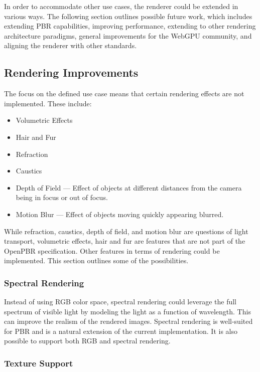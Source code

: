In order to accommodate other use cases, the renderer could be extended in various ways. The following section outlines possible future work, which includes extending \gls{PBR} capabilities, improving performance, extending to other rendering architecture paradigms, general improvements for the \gls{WebGPU} community, and aligning the renderer with other standards.

\subsection*{Rendering Improvements}

The focus on the defined use case means that certain rendering effects are not implemented. These include:

\begin{itemize}
  \item{Volumetric Effects}
  \item{Hair and Fur}
  \item{Refraction}
  \item{Caustics}
  \item{Depth of Field} — Effect of objects at different distances from the camera being in focus or out of focus.
  \item{Motion Blur} — Effect of objects moving quickly appearing blurred.
\end{itemize}

While refraction, caustics, depth of field, and motion blur are questions of light transport, volumetric effects, hair and fur are features that are not part of the \gls{OpenPBR} specification. Other features in terms of rendering could be implemented. This section outlines some of the possibilities.

\subsubsection*{Spectral Rendering}

Instead of using \gls{RGB} color space, spectral rendering could leverage the full spectrum of visible light by modeling the light as a function of wavelength. This can improve the realism of the rendered images. Spectral rendering is well-suited for \gls{PBR} and is a natural extension of the current implementation. It is also possible to support both \gls{RGB} and spectral rendering.

\subsubsection*{Texture Support}

